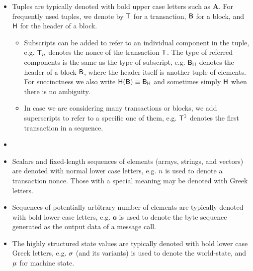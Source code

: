 \begin{itemize}[nosep]
	\item Tuples are typically denoted with bold upper case letters such as $\mathbf{A}$. 
	For frequently used tuples, we denote by $\textsf{T}$ for a {\name} transaction, $\textsf{B}$ for a {\name} block, and $\textsf{H}$ for the header of a block. 
	\begin{itemize}[nosep]
		\item Subscripts can be added to refer to an individual component in the tuple, e.g. $\textsf{T}_n$ denotes the nonce of the transaction $\textsf{T}$.
		The type of referred components is the same as the type of subscript, e.g. $\textsf{B}_{\textsf{H}}$ denotes the header of a block $\textsf{B}$, where the header itself is another tuple of elements. 
		For succinctness we also write $\textsf{H}(\textsf{B})\equiv \textsf{B}_{\textsf{H}}$ and sometimes simply $\textsf{H}$ when there is no ambiguity.

		\item In case we are considering many transactions or blocks, we add superscripts to refer to a specific one of them, e.g. $\textsf{T}^1$ denotes the first transaction in a sequence.
	\end{itemize}

	\item {}	   

	\item Scalars and fixed-length sequences of elements (arrays, strings, and vectors) are denoted with normal lower case letters, e.g. $n$ is used to denote a transaction nonce. 
	Those with a special meaning may be denoted with Greek letters.

	\item Sequences of potentially arbitrary number of elements are typically denoted with bold lower case letters, e.g. $\mathbf{o}$ is used to denote the byte sequence generated as the output data of a message call.

	\item The highly structured state values are typically denoted with bold lower case Greek letters, e.g. $\mathbf{\sigma}$ (and its variants) is used to denote the world-state, and $\mathbf{\mu}$ for machine state.
		

\end{itemize}
